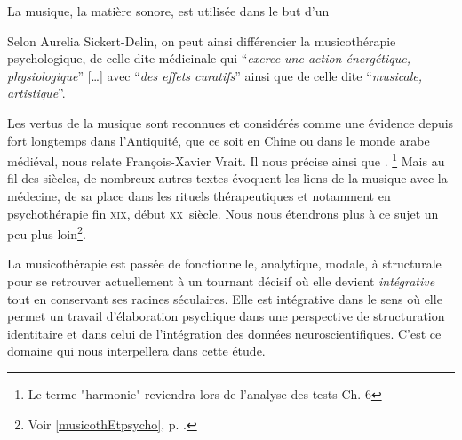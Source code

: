 La musique, la matière sonore, est utilisée dans le but d'un 

 Selon Aurelia Sickert-Delin, on peut ainsi différencier la musicothérapie 
psychologique, de celle dite médicinale qui 
\enquote{\emph{exerce une action 
énergétique, physiologique}} [\dots] avec \enquote{\emph{des effets curatifs}}  
ainsi que de celle dite \enquote{\emph{musicale, artistique}}.
 	 
 	 
Les vertus de la musique sont reconnues et considérés comme une évidence depuis 
fort longtemps dans l'Antiquité, que ce soit en Chine ou dans le monde arabe 
médiéval, nous relate François-Xavier Vrait.  
 Il nous précise ainsi que \autocite[ch. III, p. 
96]{vrait_musicotherapie_2018}. \footnote{Le terme "harmonie" reviendra lors de l'analyse des tests Ch. 6}
Mais au fil des siècles, de nombreux autres 
textes évoquent les liens de la musique avec la médecine, de sa place dans les 
rituels thérapeutiques et notamment en psychothérapie fin \textsc{xix}\ieme, 
début \textsc{xx}\ieme\ siècle. Nous nous étendrons plus à ce sujet un peu plus 
loin\footnote{Voir \ref{musicothEtpsycho}, p. \pageref{musicothEtpsycho}.}.
 
 La musicothérapie est passée de fonctionnelle, analytique, mo\-da\-le,  à 
struc\-tu\-rale pour se retrouver actuellement 
 à un tournant décisif où elle devient 
 \emph{intégrative} tout en conservant ses racines séculaires. Elle est 
intégrative dans le sens où elle permet un travail d'élaboration psychique dans 
une perspective de structuration identitaire \autocite[ch. III, p. 53, 
105]{vrait_musicotherapie_2018} et dans celui de l'intégration des données 
neuroscientifiques.
C'est ce domaine qui nous interpellera dans cette étude.


